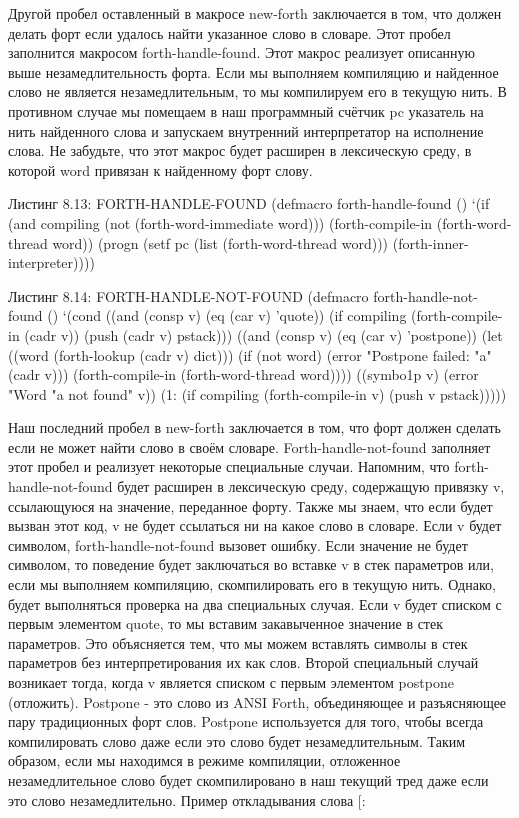Другой пробел оставленный в макросе new-forth заключается в том, что должен делать форт если удалось найти указанное слово в словаре. Этот пробел заполнится макросом forth-handle-found. Этот макрос реализует описанную выше незамедлительность форта. Если мы выполняем компиляцию и найденное слово не является незамедлительным, то мы компилируем его в текущую нить. В противном случае мы помещаем в наш программный счётчик pc указатель на нить найденного слова и запускаем внутренний интерпретатор на исполнение слова. Не забудьте, что этот макрос будет расширен в лексическую среду, в которой word привязан к найденному форт слову.

Листинг 8.13: FORTH-HANDLE-FOUND
(defmacro forth-handle-found ()
‘(if (and compiling
(not (forth-word-immediate word)))
(forth-compile-in (forth-word-thread word))
(progn
(setf pc (list (forth-word-thread word)))
(forth-inner-interpreter))))

Листинг 8.14: FORTH-HANDLE-NOT-FOUND
(defmacro forth-handle-not-found ()
‘(cond
((and (consp v) (eq (car v) ’quote))
(if compiling
(forth-compile-in (cadr v))
(push (cadr v) pstack)))
((and (consp v) (eq (car v) ’postpone))
(let ((word (forth-lookup (cadr v) dict)))
(if (not word)
(error "Postpone failed: "a" (cadr v)))
(forth-compile-in (forth-word-thread word))))
((symbo1p v)
(error "Word "a not found" v))
(1:
(if compiling
(forth-compile-in v)
(push v pstack)))))

Наш последний пробел в new-forth заключается в том, что форт должен сделать если не может найти слово в своём словаре. Forth-handle-not-found заполняет этот пробел и реализует некоторые специальные случаи. Напомним, что forth-handle-not-found будет расширен в лексическую среду, содержащую привязку v, ссылающуюся на значение, переданное форту. Также мы знаем, что если будет вызван этот код, v не будет ссылаться ни на какое слово в словаре. Если v будет символом, forth-handle-not-found вызовет ошибку. Если значение не будет символом, то поведение будет заключаться во вставке v в стек параметров или, если мы выполняем компиляцию, скомпилировать его в текущую нить. Однако, будет выполняться проверка на два специальных случая. Если v будет списком с первым элементом quote, то мы вставим закавыченное значение в стек параметров. Это объясняется тем, что мы можем вставлять символы в стек параметров без интерпретирования их как слов. Второй специальный случай возникает тогда, когда v является списком с первым элементом postpone (отложить). Postpone - это слово из ANSI Forth, объединяющее и разъясняющее пару традиционных форт слов. Postpone используется для того, чтобы всегда компилировать слово даже если это слово будет незамедлительным. Таким образом, если мы находимся в режиме компиляции, отложенное незамедлительное слово будет скомпилировано в наш текущий тред даже если это слово незамедлительно. Пример откладывания слова [:

